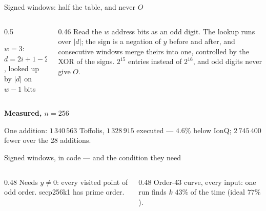 \documentclass[aspectratio=169,11pt]{beamer}
\newcommand{\peachtitle}[1]{{\bfseries\color{cverm}#1}\par\vskip1mm}
\newcommand{\code}[2][]{}
\begin{document}
\begin{frame}{Signed windows: half the table, and never $O$}
  \begin{columns}[c]
    \begin{column}{0.5\textwidth}
      \centering
      \par
      \vskip1mm
      {\scriptsize $w=3$: $d=2i+1-2^w$, looked up by $|d|$ on $w-1$ bits}
    \end{column}
    \begin{column}{0.46\textwidth}
      \small Read the $w$ address bits as an odd digit. The lookup runs over $|d|$; the sign is a negation of $y$ before and after, and consecutive windows merge theirs into one, controlled by the XOR of the signs.
      \vskip2mm
      $2^{15}$ entries instead of $2^{16}$, and odd digits never give $O$.
    \end{column}
  \end{columns}
  \vskip3mm
  \begin{peachblock}[fontupper=\small]\peachtitle{Measured, $n=256$}
    One addition: $1\,340\,563$ Toffolis, $1\,328\,915$ executed --- $4.6\%$ below IonQ; $2\,745\,400$ fewer over the 28 additions.
  \end{peachblock}
\end{frame}

\begin{frame}[fragile]{Signed windows, in code --- and the condition they need}
  \code[basicstyle=\ttfamily\fontsize{7.6}{8.8}\selectfont]{signed.py}
  \begin{columns}[T]
    \begin{column}{0.48\textwidth}
      {\small Needs $y\neq0$: every visited point of odd order. secp256k1 has prime order.}
    \end{column}
    \begin{column}{0.48\textwidth}
      {\small Order-43 curve, every input: one run finds $k$ $43\%$ of the time (ideal $77\%$).}
    \end{column}
  \end{columns}
\end{frame}
\end{document}
